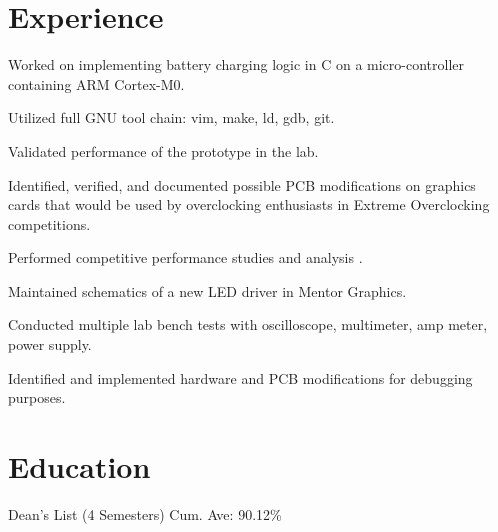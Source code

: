 \documentclass[]{deedy-resume-openfont}
\begin{document}
\section{Experience}

\begin{tightemize}
\item Worked on implementing battery charging logic in C on a micro-controller containing ARM Cortex-M0.
\item Utilized full GNU tool chain: vim, make, ld, gdb, git.
\item Validated performance of the prototype in the lab.
\end{tightemize}
\sectionsep

\begin{tightemize}
\item Identified, verified, and documented possible PCB modifications on graphics cards that would be used by overclocking enthusiasts in Extreme Overclocking competitions.
\item Performed competitive performance studies and analysis .
\end{tightemize}
\sectionsep

\begin{tightemize}
\item Maintained schematics of a new LED driver in Mentor Graphics.
\item Conducted multiple lab bench tests with oscilloscope, multimeter, amp meter, power supply.
\item Identified and implemented hardware and PCB modifications for debugging purposes.
\end{tightemize}
\sectionsep




\section{Education}
\sectionsep

Dean's List (4 Semesters) \textbullet{}
Cum. Ave: 90.12\% \\
\sectionsep
\end{document}

